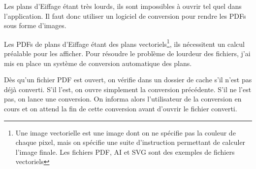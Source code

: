 Les plans d'Eiffage étant très lourds, ils sont impossibles à ouvrir tel quel dans l'application.
Il faut donc utiliser un logiciel de conversion pour rendre les PDFs sous forme d'images.

Les PDFs de plans d'Eiffage étant des plans vectoriels\footnote{Une image vectorielle est une image dont on ne spécifie pas la couleur de chaque pixel, mais on spécifie une suite d'instruction permettant de calculer l'image finale. Les fichiers PDF, AI et SVG sont des exemples de fichiers vectoriels}, ils nécessitent un calcul préalable pour les afficher.
Pour résoudre le problème de lourdeur des fichiers, j'ai mis en place un système de conversion automatique des plans.

\bigskip

Dès qu'un fichier PDF est ouvert, on vérifie dans un dossier de cache s'il n'est pas déjà converti.
S'il l'est, on ouvre simplement la conversion précédente.
S'il ne l'est pas, on lance une conversion.
On informa alors l'utilisateur de la conversion en cours et on attend la fin de cette conversion avant d'ouvrir le fichier converti.

